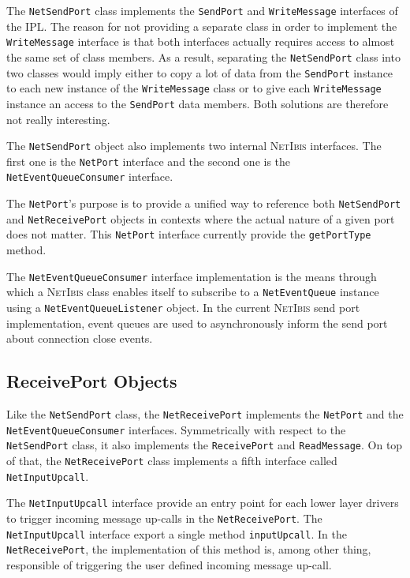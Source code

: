 \documentclass[11pt]{book}
\def\NetIbis{\textsc{NetIbis}\xspace}
\begin{document}
The \texttt{NetSendPort} class implements the \texttt{SendPort} and
\texttt{WriteMessage} interfaces of the IPL. The reason for not
providing a separate class in order to implement the
\texttt{WriteMessage} interface is that both interfaces actually
requires access to almost the same set of class members. As a result,
separating the \texttt{NetSendPort} class into two classes would imply
either to copy a lot of data from the \texttt{SendPort} instance to
each new instance of the \texttt{WriteMessage} class or to give each
\texttt{WriteMessage} instance an access to the \texttt{SendPort} data
members. Both solutions are therefore not really interesting.

The \texttt{NetSendPort} object also implements two internal \NetIbis
interfaces.  The first one is the \texttt{NetPort} interface and
the second one is the \texttt{NetEventQueueConsumer} interface.

The \texttt{NetPort}'s purpose is to provide a unified way to
reference both \texttt{NetSendPort} and \texttt{NetReceivePort}
objects in contexts where the actual nature of a given port does not
matter. This \texttt{NetPort} interface currently provide the
\texttt{getPortType} method.

The \texttt{NetEventQueueConsumer} interface implementation is the means
through which a \NetIbis class enables itself to subscribe to a
\texttt{NetEventQueue} instance using a \texttt{NetEventQueueListener}
object. In the current \NetIbis send port implementation, event queues
are used to asynchronously inform the send port about connection close
events.

\subsection{ReceivePort Objects}
\label{sec:receiveport-objects}

Like the \texttt{NetSendPort} class, the \texttt{NetReceivePort}
implements the \texttt{NetPort} and the \texttt{NetEventQueueConsumer}
interfaces. Symmetrically with respect to the \texttt{NetSendPort}
class, it also implements the \texttt{ReceivePort} and
\texttt{ReadMessage}. On top of that, the \texttt{NetReceivePort}
class implements a fifth interface called \texttt{NetInputUpcall}.

The \texttt{NetInputUpcall} interface provide an entry point for each
lower layer drivers to trigger incoming message up-calls in the
\texttt{NetReceivePort}. The \texttt{NetInputUpcall} interface export
a single method \texttt{inputUpcall}. In the \texttt{NetReceivePort},
the implementation of this method is, among other thing, responsible
of triggering the user defined incoming message up-call.
\end{document}
